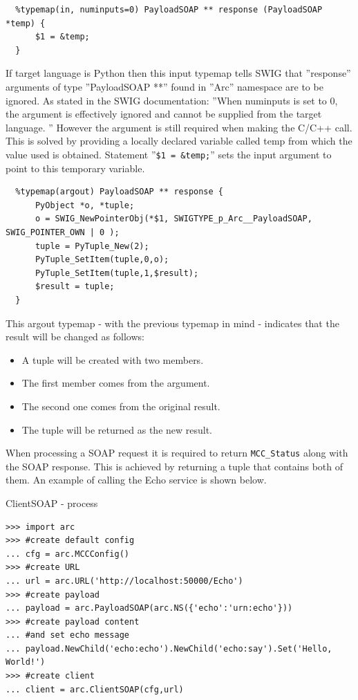 \documentclass{article}
\begin{document}
\begin{flushleft}
\begin{itemize}
{\begin{verbatim}
  %typemap(in, numinputs=0) PayloadSOAP ** response (PayloadSOAP *temp) {
      $1 = &temp;
  }
  \end{verbatim}
  If target language is Python then this input typemap tells SWIG that ''response'' 
  arguments of type ''PayloadSOAP **'' found in ''Arc'' namespace are to be ignored. 
  As stated in the SWIG documentation: ''When numinputs is set to 0, the argument is 
  effectively ignored and cannot be supplied from the target language. '' 
  However the argument is still required when making the C/C++ call. This is solved 
  by providing a locally declared variable called temp from which the value used is 
  obtained. Statement ''\verb#$1 = &temp;#'' sets the input argument to point to this 
  temporary variable.
  \begin{verbatim}
  %typemap(argout) PayloadSOAP ** response {
      PyObject *o, *tuple;
      o = SWIG_NewPointerObj(*$1, SWIGTYPE_p_Arc__PayloadSOAP, SWIG_POINTER_OWN | 0 );
      tuple = PyTuple_New(2);
      PyTuple_SetItem(tuple,0,o);
      PyTuple_SetItem(tuple,1,$result);
      $result = tuple;
  }
  \end{verbatim}
  This argout typemap - with the previous typemap in mind - indicates that the result will be changed as follows:
    \begin{itemize}
    \item{
      A tuple will be created with two members.
    }
    \item{
      The first member comes from the argument.
    }
    \item{
      The second one comes from the original result.
    }
    \item{
      The tuple will be returned as the new result.
    }
    \end{itemize}
  When processing a SOAP request it is required to return \verb$MCC_Status$ along with
  the SOAP response. This is achieved by returning a tuple that contains both of them.
  An example of calling the Echo service is shown below.
    \begin{example}
      \caption{ClientSOAP - process}\label{procex}
\begin{verbatim}
>>> import arc
>>> #create default config
... cfg = arc.MCCConfig()
>>> #create URL
... url = arc.URL('http://localhost:50000/Echo')
>>> #create payload
... payload = arc.PayloadSOAP(arc.NS({'echo':'urn:echo'}))
>>> #create payload content
... #and set echo message
... payload.NewChild('echo:echo').NewChild('echo:say').Set('Hello, World!')
>>> #create client
... client = arc.ClientSOAP(cfg,url)

\end{verbatim}
\end{example}}
\end{itemize}
\end{flushleft}
\end{document}
